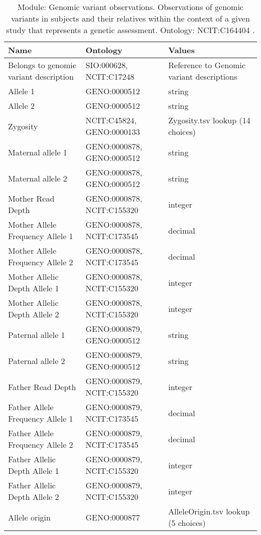 \documentclass{article}
\begin{document}
\begin{table}[htb]
\begin{tabular}{lll}
Name & Ontology & Values \\
\hline
Belongs to genomic variant description & SIO:000628, NCIT:C17248  & Reference to Genomic variant descriptions \\
Allele 1 & GENO:0000512  & string \\
Allele 2 & GENO:0000512  & string \\
Zygosity & NCIT:C45824, GENO:0000133  & Zygosity.tsv lookup (14 choices) \\
Maternal allele 1 & GENO:0000878, GENO:0000512  & string \\
Maternal allele 2 & GENO:0000878, GENO:0000512  & string \\
Mother Read Depth & GENO:0000878, NCIT:C155320  & integer \\
Mother Allele Frequency Allele 1 & GENO:0000878, NCIT:C173545  & decimal \\
Mother Allele Frequency Allele 2 & GENO:0000878, NCIT:C173545  & decimal \\
Mother Allelic Depth Allele 1 & GENO:0000878, NCIT:C155320  & integer \\
Mother Allelic Depth Allele 2 & GENO:0000878, NCIT:C155320  & integer \\
Paternal allele 1 & GENO:0000879, GENO:0000512  & string \\
Paternal allele 2 & GENO:0000879, GENO:0000512  & string \\
Father Read Depth & GENO:0000879, NCIT:C155320  & integer \\
Father Allele Frequency Allele 1 & GENO:0000879, NCIT:C173545  & decimal \\
Father Allele Frequency Allele 2 & GENO:0000879, NCIT:C173545  & decimal \\
Father Allelic Depth Allele 1 & GENO:0000879, NCIT:C155320  & integer \\
Father Allelic Depth Allele 2 & GENO:0000879, NCIT:C155320  & integer \\
Allele origin & GENO:0000877  & AlleleOrigin.tsv lookup (5 choices) \\
\hline
\end{tabular}
\caption[Module: Genomic variant observations]{\label{table:table21} Module: Genomic variant observations. Observations of genomic variants in subjects and their relatives within the context of a given study that represents a genetic assessment. Ontology: NCIT:C164404 . }
\end{table}
\end{document}
